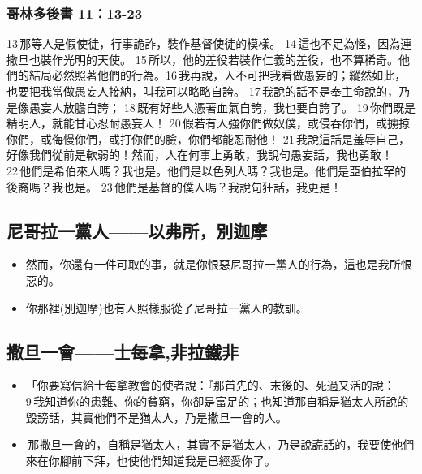  \subsubsection{哥林多後書 11：13-23}
 13 那等人是假使徒，行事詭詐，裝作基督使徒的模樣。 14 這也不足為怪，因為連撒旦也裝作光明的天使。 15 所以，他的差役若裝作仁義的差役，也不算稀奇。他們的結局必然照著他們的行為。16 我再說，人不可把我看做愚妄的；縱然如此，也要把我當做愚妄人接納，叫我可以略略自誇。 17 我說的話不是奉主命說的，乃是像愚妄人放膽自誇； 18 既有好些人憑著血氣自誇，我也要自誇了。 19 你們既是精明人，就能甘心忍耐愚妄人！ 20 假若有人強你們做奴僕，或侵吞你們，或擄掠你們，或侮慢你們，或打你們的臉，你們都能忍耐他！ 21 我說這話是羞辱自己，好像我們從前是軟弱的！然而，人在何事上勇敢，我說句愚妄話，我也勇敢！ 22 他們是希伯來人嗎？我也是。他們是以色列人嗎？我也是。他們是亞伯拉罕的後裔嗎？我也是。 23 他們是基督的僕人嗎？我說句狂話，我更是！
 
 \subsection{尼哥拉一黨人——以弗所，別迦摩}
 \begin{itemize}
 \itemsep-.25em
\item 然而，你還有一件可取的事，就是你恨惡尼哥拉一黨人的行為，這也是我所恨惡的。
\item 你那裡(別迦摩)也有人照樣服從了尼哥拉一黨人的教訓。
 \end{itemize}
 
 
 \subsection{撒旦一會——士每拿,非拉鐵非}
 \begin{itemize}
 \itemsep-.25em
\item  「你要寫信給士每拿教會的使者說：『那首先的、末後的、死過又活的說： 9 我知道你的患難、你的貧窮，你卻是富足的；也知道那自稱是猶太人所說的毀謗話，其實他們不是猶太人，乃是撒旦一會的人。
\item  那撒旦一會的，自稱是猶太人，其實不是猶太人，乃是說謊話的，我要使他們來在你腳前下拜，也使他們知道我是已經愛你了。
 \end{itemize}
 
 
